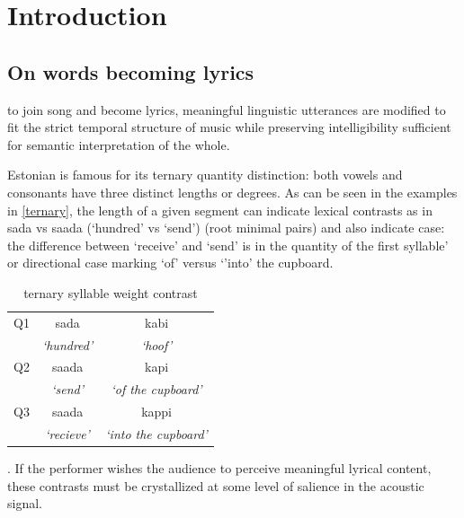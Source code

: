 \chapter{Introduction}

\section{On words becoming lyrics}
to join song and become lyrics, meaningful linguistic utterances are modified to fit the strict temporal structure of music while preserving intelligibility sufficient for semantic interpretation of the whole. 

Estonian is famous for its ternary quantity distinction: both vowels and consonants have three distinct lengths or degrees. As can be seen in the examples in \ref{ternary}, the length of a given segment can indicate lexical contrasts as in sada vs saada (`hundred' vs `send') (root minimal pairs) and also indicate case: the difference between `receive' and `send' is in the quantity of the first syllable' or directional case marking `of' versus `'into' the cupboard. 



 \begin{table}[htb]
\centering
\begin{tabular}{lcc}
\hline

Q1 &		 sada 		& 	kabi  \\  
	&	 {\it `hundred'} 	&	 {\it`hoof' }\\
\hline
Q2 &		saada 		&	kapi \\
	&	 {\it`send' }		&	{\it`of the cupboard' }		\\
\hline
Q3 &		saada 	&	 kappi 	\\
	&	{\it`recieve' }	&	{\it`into the cupboard' }	\\
\hline
\end{tabular}
\label{qexamps}
\caption{ternary syllable weight contrast}
\end{table}

. If the performer wishes the audience to perceive meaningful lyrical content, these contrasts must be crystallized at some level of salience in the acoustic signal. 
%


